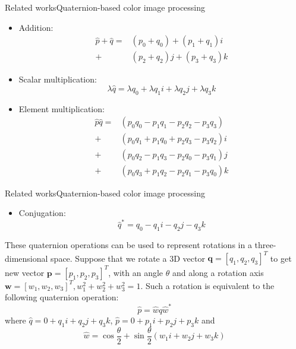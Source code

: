 \documentclass{beamer}
\begin{document}
\begin{frame}{Related works}{Quaternion-based color image processing}
    \begin{itemize}
        \item Addition:
        \begin{equation*}
            \begin{split}
                \hat{p}+\hat{q}=&(p_0+q_0)+(p_1+q_1)i\\
                                +&(p_2+q_2)j+(p_3+q_3)k
            \end{split}
        \end{equation*}
        \item Scalar multiplication: $$\lambda \hat{q}=\lambda q_0+\lambda q_1i+\lambda q_2j+\lambda q_3k$$
        \item Element multiplication: 
        \begin{equation*}
            \begin{split}
                \hat{p}\hat{q}=&(p_0q_0-p_1q_1-p_2q_2-p_3q_3)\\
                            +&(p_0q_1+p_1q_0+p_2q_3-p_3q_2)i\\
                            +&(p_0q_2-p_1q_3-p_2q_0-p_3q_1)j\\
                            +&(p_0q_3+p_1q_2-p_2q_1-p_3q_0)k
            \end{split}
        \end{equation*}
    \end{itemize}
\end{frame}

\begin{frame}{Related works}{Quaternion-based color image processing}
    \begin{itemize}
        \item Conjugation: $$\hat{q}^*=q_0-q_1i-q_2j-q_3k$$
    \end{itemize}
    These quaternion operations can be used to represent rotations in a three-dimensional space. Suppose that we rotate a 3D vector $\textbf{q}=[q_1,q_2,q_3]^T$ to get new vector $\textbf{p}=[p_1,p_2,p_3]^T$, with an angle $\theta$ and along a rotation axis $\textbf{w}=[w_1,w_2,w_3]^T, w_1^2+w_2^2+w_3^2=1$. Such a rotation is equivalent to the following
    quaternion operation:
    \begin{equation}
        \hat{p}=\hat{w}\hat{q}\hat{w}^*
    \end{equation}
    where $\hat{q}= 0 + q_1i + q_2j + q_3k$, $\hat{p}= 0 + p_1i + p_2j + p_3k$ and 
    \begin{equation}
        \hat{w}=\cos\frac{\theta}{2}+\sin\frac{\theta}{2}(w_1i + w_2j + w_3k)
    \end{equation}
\end{frame}
\end{document}
